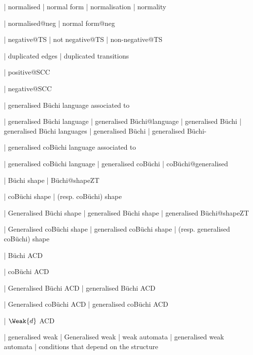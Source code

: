   | normalised
  | normal form
  | normalisation
  | normality
  
| normalised@neg
| normal form@neg
  
  | negative@TS
  | not negative@TS
  | non-negative@TS

  | duplicated edges
  | duplicated transitions

| positive@SCC

| negative@SCC


  | generalised Büchi language associated to

  | generalised B\"uchi language
  | generalised B\"uchi@language
  | generalised B\"uchi
  | generalised B\"uchi languages
  | generalised Büchi
  | generalised B\"uchi-
  
  | generalised coB\"uchi language associated to

  | generalised coB\"uchi language
  | generalised coB\"uchi
  | coB\"uchi@generalised
 
 
  | B\"uchi shape
 | B\"uchi@shapeZT
 
  | coB\"uchi shape
 | (resp. coB\"uchi) shape
 
  | Generalised B\"uchi shape
  | generalised B\"uchi shape
 | generalised B\"uchi@shapeZT
 
  | Generalised coB\"uchi shape
  | generalised coB\"uchi shape
  | (resp. generalised coB\"uchi) shape


  | B\"uchi ACD

  | coB\"uchi ACD

  | Generalised B\"uchi ACD
  | generalised B\"uchi ACD

  | Generalised coB\"uchi ACD
  | generalised coB\"uchi ACD
 
  
| $\Weak {d}$ ACD

 | generalised weak
 | Generalised weak
 | weak automata
 | generalised weak automata
 | conditions that depend on the structure


